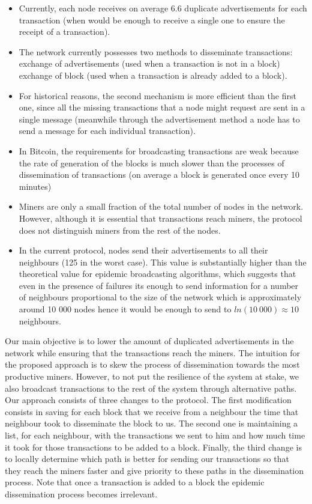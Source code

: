 \documentclass{dads}   %
\begin{document}
\begin{itemize}
  \item Currently, each node receives on average $6.6$ duplicate advertisements for each transaction (when would be enough to receive a single one to ensure the receipt of a transaction).
  \item The network currently possesses two methods to disseminate transactions: exchange of advertisements (used when a transaction is not in a block) exchange of block (used when a transaction is already added to a block).
  \item For historical reasons, the second mechanism is more efficient than the first one, since all the missing transactions that a node might request are sent in a single message (meanwhile through the advertisement method a node has to send a message for each individual transaction).
  \item In Bitcoin, the requirements for broadcasting transactions are weak because the rate of generation of the blocks is much slower than the processes of dissemination of transactions (on average a block is generated once every 10 minutes)
  \item Miners are only a small fraction of the total number of nodes in the network. However, although it is essential that transactions reach miners, the protocol does not distinguish miners from the rest of the nodes.
  \item In the current protocol, nodes send their advertisements to all their neighbours (125 in the worst case). This value is substantially higher than the theoretical value for epidemic broadcasting algorithms, which suggests that even in the presence of failures its enough to send information for a number of neighbours proportional to the size of the network which is approximately around 10 000 nodes hence it would be enough to send to $ ln(10~000) \approx 10$ neighbours.
\end{itemize}

Our main objective is to lower the amount of duplicated advertisements in the network while ensuring that the transactions reach the miners. The intuition for the proposed approach is to skew the process of dissemination towards the most productive miners. However, to not put  the resilience of the system at stake, we also broadcast transactions to the rest of the system through alternative paths. Our approach consists of three changes to the protocol. The first modification consists in saving for each block that we receive from a neighbour the time that neighbour took to disseminate the block to us. The second one is maintaining a list, for each neighbour, with the transactions we sent to him and how much time it took for those transactions to be added to a block. Finally, the third change is to locally determine which path is better for sending our transactions so that they reach the miners faster and give priority to these paths in the dissemination process. Note that once a transaction is added to a block the epidemic dissemination process becomes irrelevant.
\end{document}

